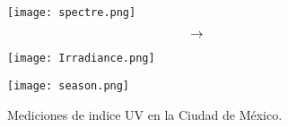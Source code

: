 \begin{frame}
    \hspace{-0.75cm}
    \begin{minipage}{0.45\linewidth}
        \begin{figure}[H]
            \color{black}
            \centering
            \texttt{[image: spectre.png]}
        \end{figure}
    \end{minipage}
    \hspace{0.5cm}
    \begin{minipage}{0.12\linewidth}
        \Huge
        \begin{equation*}
            \color{black}
            \rightarrow
        \end{equation*}
    \end{minipage}
    \begin{minipage}{0.38\linewidth}
        \begin{figure}[H]
            \texttt{[image: Irradiance.png]}
        \end{figure}
    \end{minipage}
\end{frame}

\begin{frame}
    \Huge
\end{frame}


\begin{frame}
\end{frame}

\begin{frame}
    \renewcommand{\yourowntexcol}{black}
    \begin{figure}[H]
        \centering
        \texttt{[image: season.png]}
        \caption{Mediciones de indice UV en la Ciudad de México. \cite{SEDEMA_page}}
    \end{figure}
\end{frame}